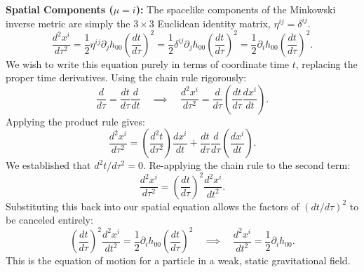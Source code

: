 \documentclass[11pt, a4paper]{report}
\begin{document}
\textbf{Spatial Components ($\mu = i$):}
The spacelike components of the Minkowski inverse metric are simply the $3 \times 3$ Euclidean identity matrix, $\eta^{ij} = \delta^{ij}$. 
\begin{equation}
\frac{d^{2}x^{i}}{d\tau^{2}} = \frac{1}{2}\eta^{ij}\partial_{j}h_{00}\left(\frac{dt}{d\tau}\right)^{2} = \frac{1}{2}\delta^{ij}\partial_{j}h_{00}\left(\frac{dt}{d\tau}\right)^{2} = \frac{1}{2}\partial_{i}h_{00}\left(\frac{dt}{d\tau}\right)^{2}.
\end{equation}
We wish to write this equation purely in terms of coordinate time $t$, replacing the proper time derivatives. Using the chain rule rigorously:
\begin{equation}
\frac{d}{d\tau} = \frac{dt}{d\tau} \frac{d}{dt} \quad \implies \quad \frac{d^{2}x^{i}}{d\tau^{2}} = \frac{d}{d\tau}\left( \frac{dt}{d\tau}\frac{dx^{i}}{dt} \right).
\end{equation}
Applying the product rule gives:
\begin{equation}
\frac{d^{2}x^{i}}{d\tau^{2}} = \left(\frac{d^{2}t}{d\tau^{2}}\right)\frac{dx^{i}}{dt} + \frac{dt}{d\tau} \frac{d}{d\tau}\left(\frac{dx^{i}}{dt}\right).
\end{equation}
We established that $d^{2}t/d\tau^{2} = 0$. Re-applying the chain rule to the second term:
\begin{equation}
\frac{d^{2}x^{i}}{d\tau^{2}} = \left(\frac{dt}{d\tau}\right)^{2} \frac{d^{2}x^{i}}{dt^{2}}.
\end{equation}
Substituting this back into our spatial equation allows the factors of $(dt/d\tau)^{2}$ to be canceled entirely:
\begin{equation}
\left(\frac{dt}{d\tau}\right)^{2} \frac{d^{2}x^{i}}{dt^{2}} = \frac{1}{2}\partial_{i}h_{00}\left(\frac{dt}{d\tau}\right)^{2} \quad \implies \quad \frac{d^{2}x^{i}}{dt^{2}} = \frac{1}{2}\partial_{i}h_{00}.
\end{equation}
This is the equation of motion for a particle in a weak, static gravitational field. 
\end{document}
